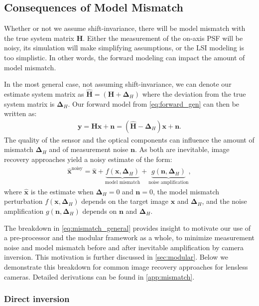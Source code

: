 \subsection{Consequences of Model Mismatch}
\label{sec:model_mismatch}

\noindent Whether or not we assume shift-invariance, there will be model mismatch with the true system matrix $\bm{H}$. 
Either the measurement of the on-axis PSF will be noisy, its simulation will make simplifying assumptions, or the LSI modeling is too simplistic.
In other words, the forward modeling can impact the amount of model mismatch.

In the most general case, \ie not assuming shift-invariance, we can denote our estimate system matrix as $\bm{\hat{H}}=(\bm{H}+\bm{\Delta}_H)$ where the deviation from the true system matrix is $\bm{\Delta}_H$.
Our forward model from \cref{eq:forward_gen} can then be written as:
\begin{align}
    \label{eq:mismatch_forward}
    \bm{y} = \bm{H}\bm{x} + \bm{n} = (\bm{\hat{H}} - \bm{\Delta}_H)\bm{x} + \bm{n}.
\end{align}
The quality of the sensor and the optical components can influence the amount of mismatch $\bm{\Delta}_H$ and of measurement noise $\bm{n}$.
As both are inevitable, 
image recovery approaches
yield a noisy estimate of the form:
\begin{align}
    \label{eq:mismatch_general}
    \bm{\hat{x}}^{\text{noisy}} = \bm{\hat{x}} + \underbrace{f(\bm{x}, \bm{\Delta}_H)}_{\text{model mismatch}} +  \underbrace{g(\bm{n}, \bm{\Delta}_H)}_{\text{noise amplification}},
\end{align}
where $\bm{\hat{x}}$ is the estimate when $\bm{\Delta}_H=0$ and $\bm{n}=0$, 
the model mismatch perturbation $f(\bm{x}, \bm{\Delta}_H)$ depends on the target image $\bm{x}$ and $\bm{\Delta}_H$, and the noise amplification $g(\bm{n}, \bm{\Delta}_H)$ depends on $\bm{n}$ and $\bm{\Delta}_H$.

The breakdown in \cref{eq:mismatch_general} provides insight to motivate our use of a pre-processor and the modular framework as a whole, \ie to minimize measurement noise and model mismatch before and after inevitable amplification by camera inversion. 
This motivation is further discussed in \cref{sec:modular}.
Below we demonstrate this breakdown for common image recovery approaches for lensless cameras.
Detailed derivations can be found in \cref{app:mismatch}.

\subsubsection{Direct inversion}

